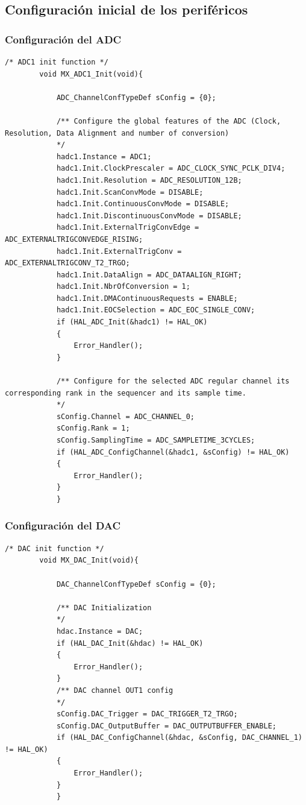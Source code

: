 \documentclass[12pt]{article}
\begin{document}
	\subsection{Configuración inicial de los periféricos}
	\subsubsection{Configuración del ADC}
	\begin{lstlisting}[style=mystyle]
		/* ADC1 init function */
		void MX_ADC1_Init(void){
			
			ADC_ChannelConfTypeDef sConfig = {0};
			
			/** Configure the global features of the ADC (Clock, Resolution, Data Alignment and number of conversion)
			*/
			hadc1.Instance = ADC1;
			hadc1.Init.ClockPrescaler = ADC_CLOCK_SYNC_PCLK_DIV4;
			hadc1.Init.Resolution = ADC_RESOLUTION_12B;
			hadc1.Init.ScanConvMode = DISABLE;
			hadc1.Init.ContinuousConvMode = DISABLE;
			hadc1.Init.DiscontinuousConvMode = DISABLE;
			hadc1.Init.ExternalTrigConvEdge = ADC_EXTERNALTRIGCONVEDGE_RISING;
			hadc1.Init.ExternalTrigConv = ADC_EXTERNALTRIGCONV_T2_TRGO;
			hadc1.Init.DataAlign = ADC_DATAALIGN_RIGHT;
			hadc1.Init.NbrOfConversion = 1;
			hadc1.Init.DMAContinuousRequests = ENABLE;
			hadc1.Init.EOCSelection = ADC_EOC_SINGLE_CONV;
			if (HAL_ADC_Init(&hadc1) != HAL_OK)
			{
				Error_Handler();
			}
			
			/** Configure for the selected ADC regular channel its corresponding rank in the sequencer and its sample time.
			*/
			sConfig.Channel = ADC_CHANNEL_0;
			sConfig.Rank = 1;
			sConfig.SamplingTime = ADC_SAMPLETIME_3CYCLES;
			if (HAL_ADC_ConfigChannel(&hadc1, &sConfig) != HAL_OK)
			{
				Error_Handler();
			}
			}
	\end{lstlisting}
	
	\subsubsection{Configuración del DAC}
	\begin{lstlisting}[style=mystyle]
		/* DAC init function */
		void MX_DAC_Init(void){
			
			DAC_ChannelConfTypeDef sConfig = {0};
			
			/** DAC Initialization
			*/
			hdac.Instance = DAC;
			if (HAL_DAC_Init(&hdac) != HAL_OK)
			{
				Error_Handler();
			}
			/** DAC channel OUT1 config
			*/
			sConfig.DAC_Trigger = DAC_TRIGGER_T2_TRGO;
			sConfig.DAC_OutputBuffer = DAC_OUTPUTBUFFER_ENABLE;
			if (HAL_DAC_ConfigChannel(&hdac, &sConfig, DAC_CHANNEL_1) != HAL_OK)
			{
				Error_Handler();
			}
			}
	\end{lstlisting}
	
\end{document}
